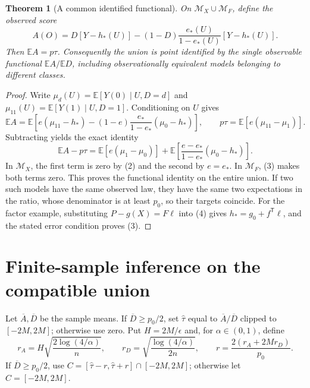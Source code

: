 \documentclass[11pt]{article}
\newtheorem{theorem}{Theorem}
\theoremstyle{remark}
\newcommand{\E}{\mathbb E}
\begin{document}
\begin{theorem}[A common identified functional]
On $\mathcal M_X\cup\mathcal M_F$, define the observed score
\[
 A(O)=D[Y-h_*(U)]-
       (1-D)\frac{e_*(U)}{1-e_*(U)}[Y-h_*(U)].
 \tag{5}
\]
Then $\E A=p\tau$. Consequently the union is point identified by the
single observable functional $\E A/\E D$, including observationally
equivalent models belonging to different classes.
\end{theorem}
\begin{proof}
Write $\mu_d(U)=\E[Y(0)\mid U,D=d]$ and
$\mu_{11}(U)=\E[Y(1)\mid U,D=1]$. Conditioning on $U$ gives
\[
 \E A=\E\left[e(\mu_{11}-h_*)
       -(1-e)\frac{e_*}{1-e_*}(\mu_0-h_*)\right],\qquad
 p\tau=\E[e(\mu_{11}-\mu_1)].
\]
Subtracting yields the exact identity
\[
 \E A-p\tau=
 \E[e(\mu_1-\mu_0)]+
 \E\left[\frac{e-e_*}{1-e_*}(\mu_0-h_*)\right]. \tag{6}
\]
In $\mathcal M_X$, the first term is zero by (2) and the second by
$e=e_*$. In $\mathcal M_F$, (3) makes both terms zero. This proves the
functional identity on the entire union. If two such models have the
same observed law, they have the same two expectations in the ratio,
whose denominator is at least $p_0$, so their targets coincide.
For the factor example, substituting $P-g(X)=F\ell$ into (4) gives
$h_*=g_0+f^\mathsf T\ell$, and the stated error condition proves (3).
\end{proof}

\section{Finite-sample inference on the compatible union}
Let $\overline A,\overline D$ be the sample means. If
$\overline D\geq p_0/2$, set $\widehat\tau$ equal to
$\overline A/\overline D$ clipped to $[-2M,2M]$; otherwise use zero.
Put $H=2M/\epsilon$ and, for $\alpha\in(0,1)$, define
\[
 r_A=H\sqrt{\frac{2\log(4/\alpha)}n},\qquad
 r_D=\sqrt{\frac{\log(4/\alpha)}{2n}},\qquad
 r=\frac{2(r_A+2Mr_D)}{p_0}.
\]
If $\overline D\geq p_0/2$, use
$C=[\widehat\tau-r,\widehat\tau+r]\cap[-2M,2M]$;
otherwise let $C=[-2M,2M]$.
\end{document}
